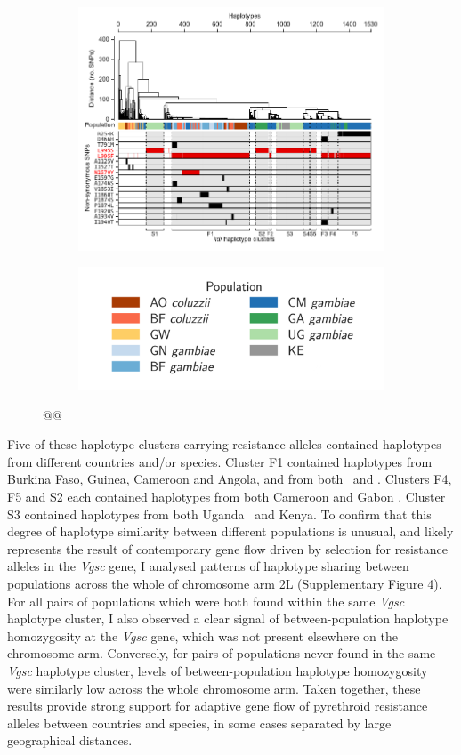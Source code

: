 \documentclass[a4paper,11pt,abstracton,hidelinks]{scrartcl}
\begin{document}
\begin{figure}[t!]
\centering
\begin{subfigure}[t]{1\textwidth}
\includegraphics[width=1\linewidth,center]{artwork/chapter6/hapclust.pdf}
\end{subfigure}
\begin{subfigure}[t]{1\textwidth}
\includegraphics[width=.5\linewidth,center]{artwork/chapter6/pop_legend.png}
\end{subfigure}
\caption{@@
}
\label{fig:hapclust}
\end{figure}


Five of these haplotype clusters carrying resistance alleles contained haplotypes from different countries and/or species.
%
Cluster F1 contained haplotypes from Burkina Faso, Guinea, Cameroon and Angola, and from both \agam\ and \acol.
%
Clusters F4, F5 and S2 each contained haplotypes from both Cameroon and Gabon \agam.
%
Cluster S3 contained haplotypes from both Uganda \agam\ and Kenya.
%
To confirm that this degree of haplotype similarity between different populations is unusual, and likely represents the result of contemporary gene flow driven by selection for resistance alleles in the \textit{Vgsc} gene, I analysed patterns of haplotype sharing between populations across the whole of chromosome arm 2L (Supplementary Figure 4).
%
For all pairs of populations which were both found within the same \textit{Vgsc} haplotype cluster, I also observed a clear signal of between-population haplotype homozygosity at the \textit{Vgsc} gene, which was not present elsewhere on the chromosome arm.
%
Conversely, for pairs of populations never found in the same \textit{Vgsc} haplotype cluster, levels of between-population haplotype homozygosity were similarly low across the whole chromosome arm.
%
Taken together, these results provide strong support for adaptive gene flow of pyrethroid resistance alleles between countries and species, in some cases separated by large geographical distances.
\end{document}
